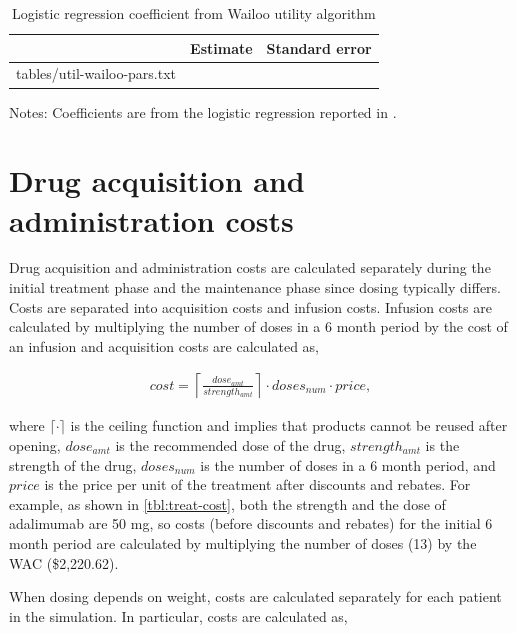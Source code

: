 \documentclass[11pt,final,fleqn]{article}\usepackage[]{graphicx}\usepackage[]{color}
\makeatletter
\theoremstyle{plain}
\newcommand*\ExpandableInput[1]{\@@input#1 }
\makeatother
\begin{document}
\begin{appendices}
\begin{table}[!ht]
\begin{center}
\begin{threeparttable}
\caption{Logistic regression coefficient from Wailoo utility algorithm} \label{tbl:util-wailoo-coef}
\begin{tabularx}{\textwidth}{@{\extracolsep{\fill}}lcc}
\hline
\multicolumn{1}{c}{} & \multicolumn{1}{c}{Estimate} & \multicolumn{1}{c}{Standard error}  \\
\hline
\ExpandableInput{tables/util-wailoo-pars.txt}
\hline
\end{tabularx}
\scriptsize
Notes: Coefficients are from the logistic regression reported in \citet{wailoo2006modeling}. 
\end{threeparttable}
\end{center}
\end{table}

\section{Drug acquisition and administration costs}\label{app:treat-cost}


Drug acquisition and administration costs are calculated separately during the initial treatment phase and the maintenance phase since dosing typically differs. Costs are separated into acquisition costs and infusion costs. Infusion costs are calculated by multiplying the number of doses in a 6 month period by the cost of an infusion and acquisition costs are calculated as,

\begin{align}
cost = \left\lceil\frac{dose_{amt}}{strength_{amt}}\right\rceil \cdot doses_{num} \cdot price,
\end{align}

where $\lceil\cdot\rceil$ is the ceiling function and implies that products cannot be reused after opening, $dose_{amt}$ is the recommended dose of the drug, $strength_{amt}$ is the strength of the drug, $doses_{num}$ is the number of doses in a 6 month period, and $price$ is the price per unit of the treatment after discounts and rebates. For example, as shown in \autoref{tbl:treat-cost}, both the strength and the dose of adalimumab are 50 mg, so costs (before discounts and rebates) for the initial 6 month period are calculated by multiplying the number of doses (13) by the WAC (\$2,220.62).

When dosing depends on weight, costs are calculated separately for each patient in the simulation. In particular, costs are calculated as,


\end{appendices}
\end{document}
